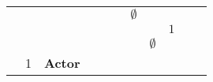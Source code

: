 \begin{table}[]
\begin{tabular}{lllllllllll}
                          &                           &                   &                                                               &                                                                                                                 &                           & \cellcolor[HTML]{FC8D59}$\emptyset$                         &                                                                            &                                                                                          &                                        &                                                                                                                 \\
                          &                           &                   &                                                               &                                                                                                                 &                           &                                                             &                                                                            & \cellcolor[HTML]{FC8D59}$1$                                                              &                                        &                                                                                                                 \\
                          &                           &                   &                                                               &                                                                                                                 &                           &                                                             & \cellcolor[HTML]{FC8D59}$\emptyset$                                        &                                                                                          &                                        &                                                                                                                 \\
                          & \cellcolor[HTML]{FC8D59}1 & \textbf{Actor}    &                                                               &                                                                                                                 &                           &                                                             &                                                                            &                                                                                          &                                        &                                                                                                                 \\

\end{tabular}
\end{table}
